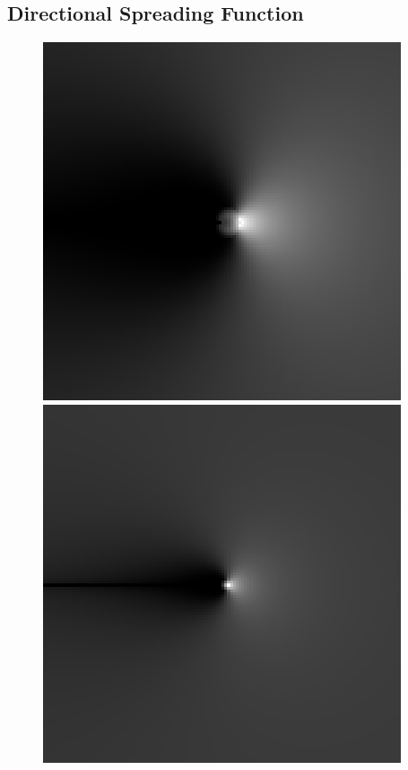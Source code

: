 \subsection{Directional Spreading Function}
%
\begin{figure}
 \centering
 \subbottom
 {
 \includegraphics[scale=1]{figures/dfilt_wr_sqrt2.png}
 }
 \subbottom
 {
 \includegraphics[scale=1]{figures/dfilt_wr_sqrt8.png}
 }
 \subbottom
 {
}
\end{figure}
